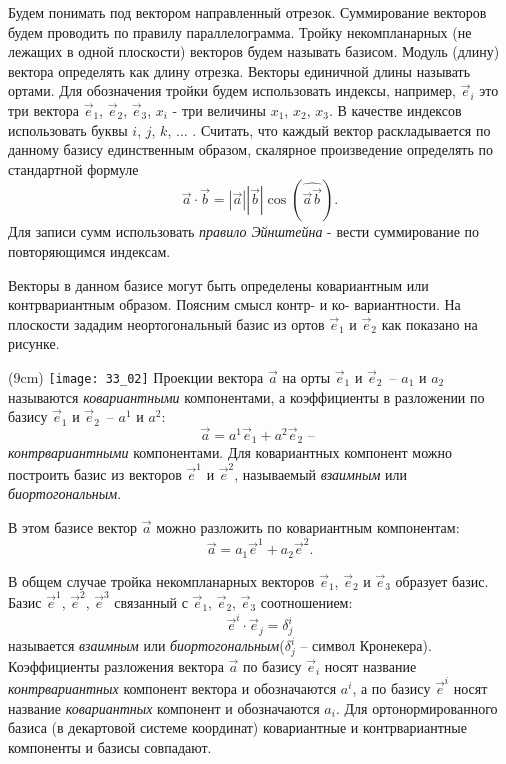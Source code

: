 Будем понимать под вектором направленный отрезок. Суммирование векторов будем
проводить по правилу параллелограмма. Тройку некомпланарных (не лежащих в одной
плоскости) векторов будем называть базисом. Модуль (длину) вектора определять
как длину отрезка. Векторы единичной длины называть ортами. Для обозначения
тройки будем использовать индексы, например, \( \vec{e}_{i} \) это три вектора
\( \vec{e}_{1} \), \( \vec{e}_{2} \), \( \vec{e}_{3} \), \( x_i \) - три
величины \( x_1 \), \( x_2 \), \( x_3 \). В качестве индексов использовать
буквы \( i \), \( j \), \( k \), \( \ldots \) . Считать, что каждый вектор
раскладывается по данному базису единственным образом, скалярное произведение
определять по стандартной формуле
\[
    \vec{a}\cdot\vec{b} = |\vec{a}||\vec{b}|\cos (\widehat{\vec{a}\vec{b}}).
\]
Для записи сумм использовать \emph{правило Эйнштейна} - вести суммирование по
повторяющимся индексам.

Векторы в данном базисе могут быть определены ковариантным или контрвариантным
образом. Поясним смысл контр- и ко- вариантности. На плоскости зададим
неортогональный базис из ортов \( \vec{e}_{1} \) и \( \vec{e}_{2} \) как
показано на рисунке.

\sidefig(9cm)
{\texttt{[image: 33\_02]}}{
Проекции вектора \( \vec{a} \) на орты \( \vec{e}_{1} \) и \( \vec{e}_{2} \)~--
\( a_1 \)  и \( a_2 \) называются \emph{ковариантными} компонентами, а
коэффициенты в разложении по базису \( \vec{e}_{1} \) и \( \vec{e}_{2} \)~--
\( a^1 \)  и \( a^2 \):
\[
    \vec{a} = a^1 \vec{e}_{1} + a^2 \vec{e}_{2} \text{ -- }
\]
\emph{контрвариантными} компонентами. Для ковариантных компонент можно
построить базис из векторов \( \vec{e}^{1} \) и \( \vec{e}^{2} \),
называемый \emph{взаимным} или \emph{биортогональным}.}

В этом базисе вектор \( \vec{a} \) можно разложить по ковариантным компонентам:
\[
    \vec{a} = a_1 \vec{e}^{1} + a_2 \vec{e}^{2}.
\]
    
В общем случае тройка некомпланарных векторов \( \vec{e}_{1} \),
\( \vec{e}_{2} \) и \( \vec{e}_{3} \) образует базис. Базис \( \vec{e}^{1} \),
\( \vec{e}^{2} \), \( \vec{e}^{3} \) связанный с \( \vec{e}_{1} \),
\( \vec{e}_{2} \), \( \vec{e}_{3} \) соотношением:
\[
    \vec{e}^{i}\cdot\vec{e}_{j} = \delta^i_{j}
\]
называется \emph{взаимным} или \emph{биортогональным}(\( \delta^i_{j} \) --
символ Кронекера).  Коэффициенты разложения вектора \( \vec{a} \) по базису
\( \vec{e}_{i} \) носят название \emph{контрвариантных} компонент вектора и
обозначаются \( a^i \), а по базису \( \vec{e}^{i} \) носят название
\emph{ковариантных} компонент и обозначаются \( a_i \). Для ортонормированного
базиса (в декартовой системе координат) ковариантные и контрвариантные
компоненты и базисы совпадают.
    
